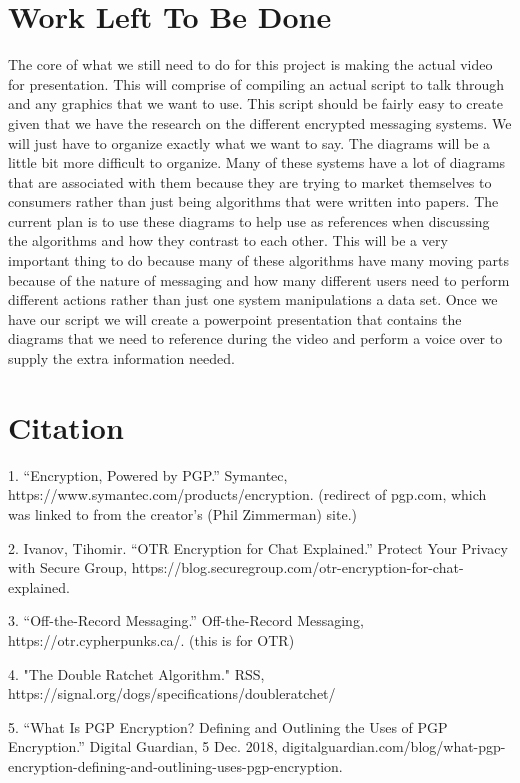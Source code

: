 \documentclass{article}
\begin{document}
\section{Work Left To Be Done}

The core of what we still need to do for this project is making the actual video for presentation. This will comprise of compiling an actual script to talk through and any graphics that we want to use. This script should be fairly easy to create given that we have the research on the different encrypted messaging systems. We will just have to organize exactly what we want to say. The diagrams will be a little bit more difficult to organize. Many of these systems have a lot of diagrams that are associated with them because they are trying to market themselves to consumers rather than just being algorithms that were written into papers. The current plan is to use these diagrams to help use as references when discussing the algorithms and how they contrast to each other. This will be a very important thing to do because many of these algorithms have many moving parts because of the nature of messaging and how many different users need to perform different actions rather than just one system manipulations a data set. Once we have our script we will create a powerpoint presentation that contains the diagrams that we need to reference during the video and perform a voice over to supply the extra information needed. 

\section{Citation}

1. “Encryption, Powered by PGP.” Symantec, https://www.symantec.com/products/encryption. (redirect of pgp.com, which was linked to from the creator's (Phil Zimmerman) site.)

2. Ivanov, Tihomir. “OTR Encryption for Chat Explained.” Protect Your Privacy with Secure Group, https://blog.securegroup.com/otr-encryption-for-chat-explained.

3. “Off-the-Record Messaging.” Off-the-Record Messaging, https://otr.cypherpunks.ca/. (this is for OTR)

4. "The Double Ratchet Algorithm." RSS, https://signal.org/dogs/specifications/doubleratchet/
	    
5. “What Is PGP Encryption? Defining and Outlining the Uses of PGP Encryption.” Digital Guardian, 5 Dec. 2018, digitalguardian.com/blog/what-pgp-encryption-defining-and-outlining-uses-pgp-encryption.
\end{document}
